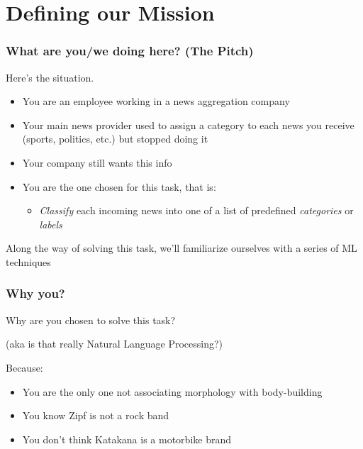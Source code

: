 \documentclass[usenames,dvipsnames]{beamer}
\newcommand{\voc}[1]{\emph{\color{ForestGreen}#1}}
\begin{document}
\section{Defining our Mission}
\begin{frame}\frametitle{What are you/we doing here? (The Pitch)}
Here's the situation.
\begin{itemize}
  \item You are an employee working in a news aggregation company
 \item Your main news provider used to assign a category to each news
    you receive (sports, politics, etc.) but stopped doing it
  \item Your company still wants this info
  \item You are the one chosen for this task, that is:
  \begin{itemize}
    \item \voc{Classify} each incoming news into one of a
      list of predefined \voc{categories} or \voc{labels}
  \end{itemize}
\end{itemize}

\pause
\vspace{0.5cm}
\begin{block}{}
Along the way of solving this task, we'll familiarize
    ourselves with a series of ML techniques
\end{block}

\end{frame}




\begin{frame}\frametitle{Why you?}
Why are you chosen to solve this task?

(aka is that really Natural Language Processing?)
\vspace{0.8cm}

Because:
\begin{itemize}
  \item You are the only one not associating morphology with body-building
  \item You know Zipf is not a rock band
  \item You don't think Katakana is a motorbike brand
\end{itemize}

\end{frame}
\end{document}
